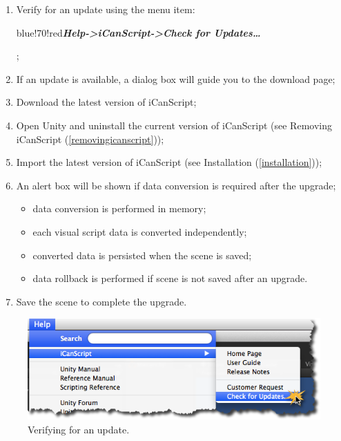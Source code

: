 \begin{enumerate}
\item Verify for an update using the menu item: \begin{color}{blue!70!red}\emph{\textbf{Help->iCanScript->Check for Updates…}}\end{color};

\item If an update is available, a dialog box will guide you to the download page;

\item Download the latest version of iCanScript;

\item Open Unity and uninstall the current version of iCanScript (see Removing iCanScript (\autoref{removingicanscript}));

\item Import the latest version of iCanScript (see Installation (\autoref{installation}));

\item An alert box will be shown if data conversion is required after the upgrade;

\begin{itemize}
\item data conversion is performed in memory;

\item each visual script data is converted independently;

\item converted data is persisted when the scene is saved;

\item data rollback is performed if scene is not saved after an upgrade.

\end{itemize}

\item Save the scene to complete the upgrade.

\end{enumerate}

\begin{figure}[htbp]
\centering
\includegraphics[keepaspectratio,width=\textwidth,height=0.75\textheight]{ics-check-for-update.png}
\caption{Verifying for an update.}
\label{ics-check-for-update.png}
\end{figure}

